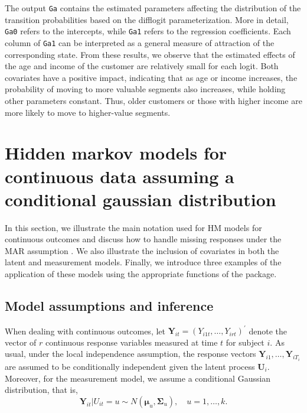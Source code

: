 The output \texttt{Ga} contains the estimated parameters affecting the
distribution of the transition probabilities based on the difflogit
parameterization. More in detail, \texttt{Ga0} refers to the intercepts, while
\texttt{Ga1} refers to the regression coefficients. Each column of \texttt{Ga1} can be
interpreted as a general measure of attraction of the corresponding
state. From these results, we observe that the estimated effects of the
age and income of the customer are relatively small for each logit. Both
covariates have a positive impact, indicating that as age or income
increases, the probability of moving to more valuable segments also
increases, while holding other parameters constant. Thus, older
customers or those with higher income are more likely to move to
higher-value segments.

\hypertarget{sec:HMcont}{%
\section{Hidden markov models for continuous data assuming a conditional gaussian distribution}\label{sec:HMcont}}

In this section, we illustrate the main notation used for HM models for
continuous outcomes and discuss how to handle missing responses under
the MAR assumption \citep{little:rub:20}. We also illustrate the
inclusion of covariates in both the latent and measurement models.
Finally, we introduce three examples of the application of these models
using the appropriate functions of the  package.

\hypertarget{sec:HMcontassump}{%
\subsection{Model assumptions and inference}\label{sec:HMcontassump}}

When dealing with continuous outcomes, let
\(\boldsymbol{Y}_{it} = (Y_{i1t}, \ldots, Y_{irt})^\prime\) denote the vector of
\(r\) continuous response variables measured at time \(t\) for subject \(i\).
As usual, under the local independence assumption, the response vectors
\(\boldsymbol{Y}_{i1}, \ldots, \boldsymbol{Y}_{iT_i}\) are assumed to be conditionally
independent given the latent process \(\boldsymbol{U}_i\). Moreover, for the
measurement model, we assume a conditional Gaussian distribution, that is,
\begin{equation}
\boldsymbol{Y}_{it}|U_{it}= u \sim N(\boldsymbol{\mu}_u,{\boldsymbol{\Sigma}}_u),\quad u=1,\ldots,k.\label{eq:norm}
\end{equation}

